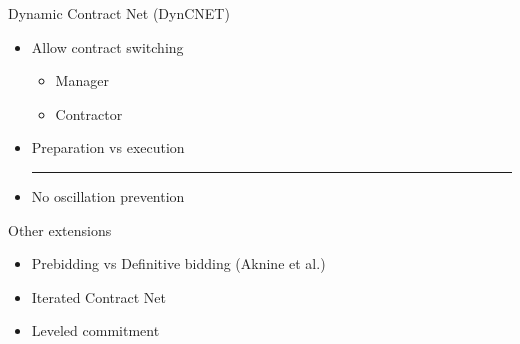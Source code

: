 \documentclass[notes]{beamer}
\newcommand{\seperation}{\vspace{0.5cm}\hrule\vspace{0.5cm}}
\begin{document}
	\begin{frame}{Dynamic Contract Net (DynCNET)}
		\begin{itemize}
			\item Allow contract switching
				\begin{itemize}
				\item Manager
				\item Contractor
				\end{itemize}
			\item Preparation vs execution
			\seperation
			\item No oscillation prevention
		\end{itemize}
	\end{frame}
	
	\begin{frame}{Other extensions}
		\begin{itemize}
			\item Prebidding vs Definitive bidding (Aknine et al.)
			\item Iterated Contract Net
			\item Leveled commitment
		\end{itemize}
	\end{frame}
	
\end{document}
